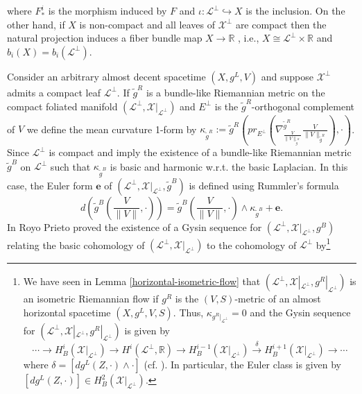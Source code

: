\documentclass[a4paper,10pt,twoside]{amsart}
\theoremstyle{definition}
\theoremstyle{remark}
\numberwithin{equation}{section}
\begin{document}
where $F^{i}_{*}$ is the morphism induced by $F$ and $\iota: \mathcal{L}^{\perp} \hookrightarrow X$ is the inclusion.
On the other hand, if $X$ is non-compact and all leaves of $\mathcal{X}^{\perp}$ are compact then the natural projection induces a fiber bundle map
$X \rightarrow {\mathbb{R}}$ \cite{MR1453120}, i.e., $X \cong \mathcal{L}^{\perp} \times {\mathbb{R}}$ and $b_{i}(X)=b_{i}(\mathcal{L}^{\perp})$.\par
Consider an arbitrary almost decent spacetime $(X,g^{L},V)$ and suppose $\mathcal{X}^{\perp}$ admits a compact leaf $\mathcal{L}^{\perp}$. If
$\tilde{g}^{R}$ is a bundle-like Riemannian metric on the compact foliated manifold $(\mathcal{L}^{\perp},\mathcal{X}|_{\mathcal{L}^{\perp}})$ and
$E^{\perp}$ is the $\tilde{g}^{R}$-orthogonal complement of $V$ we define the mean curvature 1-form by
$\kappa_{\tilde{g}^{R}}:=\tilde{g}^{R}(pr_{E^{\perp}}(\nabla^{\tilde{g}^{R}}_{\frac{V}{\|V\|_{\tilde{g}^{R}}}}{\frac{V}{\|V\|_{\tilde{g}^{R}}}}),\cdot)$.
Since $\mathcal{L}^{\perp}$ is compact \cite{MR1657170} and \cite{MR1811936} imply the existence of a bundle-like Riemannian metric $\tilde{g}^{B}$ on
$\mathcal{L}^{\perp}$ such that $\kappa_{\tilde{g}^{B}}$ is basic and harmonic w.r.t. the basic Laplacian.
In this case, the Euler form $\mathbf{e}$ of $(\mathcal{L}^{\perp},\mathcal{X}|_{\mathcal{L}^{\perp}},\tilde{g}^{B})$ is defined using Rummler's formula
\begin{equation*}
	d(\tilde{g}^{B}(\frac{V}{\|V\|},\cdot)) = \tilde{g}^{B}(\frac{V}{\|V\|},\cdot) \wedge \kappa_{\tilde{g}^{B}} + \mathbf{e}.
\end{equation*}
In \cite{MR1871045} Royo Prieto proved the existence of a Gysin sequence for $(\mathcal{L}^{\perp},\mathcal{X}|_{\mathcal{L}^{\perp}},g^{B})$ relating
the basic cohomology of $(\mathcal{L}^{\perp},\mathcal{X}|_{\mathcal{L}^{\perp}})$ to the cohomology of $\mathcal{L}^{\perp}$
by\footnote{We have seen in Lemma \ref{horizontal-isometric-flow} that
			$(\mathcal{L}^{\perp},\mathcal{X}|_{\mathcal{L}^{\perp}},g^{R}|_{\mathcal{L}^{\perp}})$ is an isometric Riemannian flow
			if $g^{R}$ is the $(V,S)$-metric of an almost horizontal spacetime $(X,g^{L},V,S)$. Thus,
			$\kappa_{g^{R}|_{\mathcal{L}^{\perp}}}=0$ and the Gysin sequence for
			$(\mathcal{L}^{\perp},\mathcal{X}|_{\mathcal{L}^{\perp}},g^{R}|_{\mathcal{L}^{\perp}})$ is given by
			\begin{equation*}
				\cdots \rightarrow H^{i}_{B}(\mathcal{X}|_{\mathcal{L}^{\perp}}) \rightarrow H^{i}(\mathcal{L}^{\perp},{\mathbb{R}}) \rightarrow
					H^{i-1}_{B}(\mathcal{X}|_{\mathcal{L}^{\perp}}) \stackrel{\delta}{\rightarrow}
						H^{i+1}_{B}(\mathcal{X}|_{\mathcal{L}^{\perp}}) \rightarrow \cdots
			\end{equation*}
			where $\delta = [dg^{L}(Z,\cdot) \wedge \cdot]$ (cf. \cite[Thm. 7.2.1]{MR2382957}). In particular, the Euler class is given by
			$[dg^{L}(Z,\cdot)] \in H^{2}_{B}(\mathcal{X}|_{\mathcal{L}^{\perp}})$.}
\end{document}
